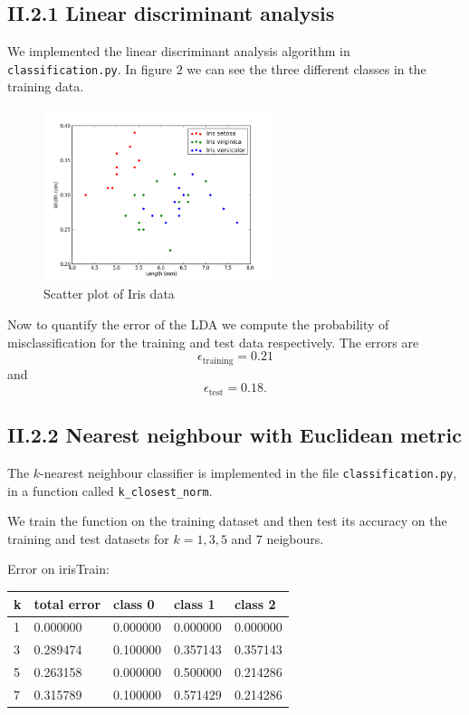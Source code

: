 \documentclass[a4paper,10pt]{article}
\begin{document}
\subsection*{II.2.1 Linear discriminant analysis}

We implemented the linear discriminant analysis algorithm in \verb=classification.py=. In figure $2$ we can see the three different classes in the training data.
\begin{figure}[H]
	\centering
  		\centering
  		\includegraphics[width=0.6\textwidth]{../images/report/iris_scatter.png}
  		\caption{Scatter plot of Iris data}
\end{figure}
Now to quantify the error of the LDA we compute the probability of misclassification for the training and test data respectively. The errors are
$$\epsilon_{\text{training}} = 0.21$$
and
$$\epsilon_{\text{test}} = 0.18.$$

\subsection*{II.2.2 Nearest neighbour with Euclidean metric}

The $k$-nearest neighbour classifier is implemented in the file \verb=classification.py=, in a function called \verb=k_closest_norm=.

We train the function on the training dataset and then test its accuracy
on the training and test datasets for $k=1,3,5$ and $7$ neigbours.

Error on irisTrain:
\begin{center}
\begin{tabular}{l|llll}
 k & total error & class 0 & class 1 & class 2\\ \hline
 1 & 0.000000 & 0.000000 & 0.000000 & 0.000000\\
 3 & 0.289474 & 0.100000 & 0.357143 & 0.357143\\
 5 & 0.263158 & 0.000000 & 0.500000 & 0.214286\\
 7 & 0.315789 & 0.100000 & 0.571429 & 0.214286\\
\end{tabular}
\end{center}
\end{document}
